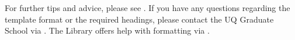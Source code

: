 \noindent
For further tips and advice, please see \href{https://my.uq.edu.au/information-and-services/higher-degree-research/my-thesis}{\color{blue}{UQ’s HDR Thesis Advice}}. If you have any questions regarding the template format or the required headings, please contact the UQ Graduate School via \href{mailto:graduateschool@uq.edu.au}{\color{blue}{graduateschool@uq.edu.au}}. The Library offers help with formatting via \href{mailto:training@library.uq.edu.au?subject=Overleaf Thesis Template help}{\color{blue}{training@library.uq.edu.au}}.


%








